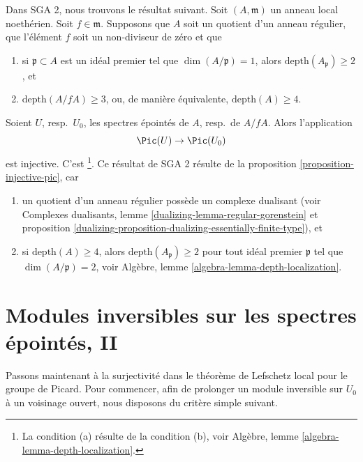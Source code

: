 \begin{remark}
\label{remark-compare-SGA2}
Dans SGA 2, nous trouvons le résultat suivant. Soit $(A, \mathfrak m)$ un
anneau local noethérien. Soit $f \in \mathfrak m$. Supposons que $A$
soit un quotient d'un anneau régulier, que l'élément
$f$ soit un non-diviseur de zéro et que
\begin{enumerate}
\item[(a)] si $\mathfrak p \subset A$ est un idéal premier tel que
$\dim(A/\mathfrak p) = 1$, alors $\text{depth}(A_\mathfrak p) \geq 2$, et
\item[(b)] $\text{depth}(A/fA) \geq 3$, ou, de manière équivalente,
$\text{depth}(A) \geq 4$.
\end{enumerate}
Soient $U$, resp.\ $U_0$, les spectres épointés de $A$, resp.\ de $A/fA$. Alors
l'application
$$
\Pic(U) \to \Pic(U_0)
$$
est injective. C'est \cite[Exposee XI, Lemma 3.16]{SGA2}\footnote{La condition
(a) résulte de la condition (b), voir
Algèbre, lemme \ref{algebra-lemma-depth-localization}.}. Ce résultat
de SGA 2 résulte de la proposition \ref{proposition-injective-pic},
car
\begin{enumerate}
\item un quotient d'un anneau régulier possède un complexe dualisant (voir
Complexes dualisants, lemme \ref{dualizing-lemma-regular-gorenstein} et
proposition \ref{dualizing-proposition-dualizing-essentially-finite-type}), et
\item si $\text{depth}(A) \geq 4$, alors $\text{depth}(A_\mathfrak p) \geq 2$
pour tout idéal premier $\mathfrak p$ tel que $\dim(A/\mathfrak p) = 2$, voir
Algèbre, lemme \ref{algebra-lemma-depth-localization}.
\end{enumerate}
\end{remark}






\section{Modules inversibles sur les spectres épointés, II}
\label{section-local-lefschetz-for-pic-surjective}

\noindent
Passons maintenant à la surjectivité dans le théorème de Lefschetz local pour le groupe de Picard.
Pour commencer, afin de prolonger un module inversible sur $U_0$ à un voisinage ouvert,
nous disposons du critère simple suivant.

